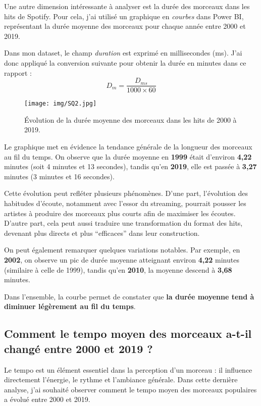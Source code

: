\documentclass[french]{article}
\newcommand{\newLine}{\vspace{0.2cm}}
\begin{document}
Une autre dimension intéressante à analyser est la durée des morceaux dans les hits de Spotify. Pour cela, j'ai utilisé un graphique en \textit{courbes} dans Power BI, représentant la durée moyenne des morceaux pour chaque année entre 2000 et 2019. \newLine \newLine

Dans mon dataset, le champ \textit{duration} est exprimé en millisecondes (ms). J'ai donc appliqué la conversion suivante pour obtenir la durée en minutes dans ce rapport :
$$
	D_m = \frac{D_{ms}}{1000 \times 60}
$$

\begin{figure}[h]
	\centering
	\texttt{[image: img/SQ2.jpg]} %
	\caption{Évolution de la durée moyenne des morceaux dans les hits de 2000 à 2019.}
	\label{fig:duree}
\end{figure}

Le graphique met en évidence la tendance générale de la longueur des morceaux au fil du temps. On observe que la durée moyenne en \textbf{1999} était d'environ \textbf{4,22} minutes (soit 4 minutes et 13 secondes), tandis qu'en \textbf{2019}, elle est passée à \textbf{3,27} minutes (3 minutes et 16 secondes). \newLine

Cette évolution peut refléter plusieurs phénomènes. D'une part, l'évolution des habitudes d'écoute, notamment avec l'essor du streaming, pourrait pousser les artistes à produire des morceaux plus courts afin de maximiser les écoutes. D'autre part, cela peut aussi traduire une transformation du format des hits, devenant plus directs et plus “efficaces” dans leur construction. \newLine

On peut également remarquer quelques variations notables. Par exemple, en \textbf{2002}, on observe un pic de durée moyenne atteignant environ \textbf{4,22} minutes (similaire à celle de 1999), tandis qu'en \textbf{2010}, la moyenne descend à \textbf{3,68} minutes. \newLine

Dans l'ensemble, la courbe permet de constater que \textbf{la durée moyenne tend à diminuer légèrement au fil du temps}. \newLine \newLine \newLine


\clearpage
\subsection{Comment le tempo moyen des morceaux a-t-il changé entre 2000 et 2019 ?}

Le tempo est un élément essentiel dans la perception d'un morceau : il influence directement l'énergie, le rythme et l'ambiance générale. Dans cette dernière analyse, j'ai souhaité observer comment le tempo moyen des morceaux populaires a évolué entre 2000 et 2019. \newLine
\end{document}
